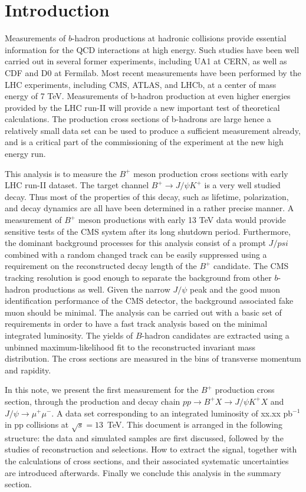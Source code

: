 \section{Introduction}
\label{sec:introduction}


Measurements of $b$-hadron productions at hadronic collisions provide essential information for the
QCD interactions at high energy.  Such studies have been well carried out in several former experiments, including UA1 at CERN, as well as CDF and D0 at Fermilab. Most recent measurements have been performed by the LHC experiments, including CMS, ATLAS, and LHCb, at a center of mass energy of 7 TeV. Measurements of b-hadron production at even higher energies provided by the LHC run-II will provide a new important test of theoretical calculations. The production cross sections of b-hadrons are large hence a relatively small data set can be used to produce a sufficient measurement already, and is a critical part of the commissioning of the experiment at the new high energy run. 

This analysis is to measure the $B^+$ meson production cross sections with early LHC run-II dataset. The target channel 
$B^+ \to J/\psi K^+$ is a very well studied decay. Thus most of the properties of this decay, such as lifetime, polarization, and decay dynamics are 
all have been determined in a rather precise manner. A measurement of $B^+$ meson productions with early 13 TeV data would provide sensitive tests of the CMS system after its long shutdown period. Furthermore, the dominant background processes for this analysis consist of a 
prompt $J/psi$ combined with a random changed track can be easily suppressed using a requirement on the reconstructed decay length of the $B^+$ candidate. The CMS tracking resolution is good enough to separate the background from other $b$-hadron productions as well. Given the narrow $J/\psi$ peak and the good muon identification performance of the CMS detector, the background associated fake muon should be minimal.
The analysis can be carried out with a basic set of requirements in order to have a fast track analysis based on the minimal integrated 
luminosity.
The yields of $B$-hadron candidates are extracted using a unbinned maximum-likelihood fit to the reconstructed invariant mass distribution.
The cross sections are measured in the bins of transverse momentum and rapidity. 

In this note, we present the first measurement for the $B^+$ production cross section, through the production and decay chain $pp \to B^+X \to J/\psi K^+ X$ and $J/\psi \to \mu^+\mu^-$. A data set corresponding to an integrated luminosity of xx.xx pb$^{-1}$ in pp collisions at $\sqrt{s} = 13$~TeV. This document is arranged in the following structure: the data and simulated samples are first discussed, followed by the studies of reconstruction and selections. How to extract the signal, together with the calculations of cross sections, and their associated systematic uncertainties are introduced afterwards. Finally we conclude this analysis in the summary section. 